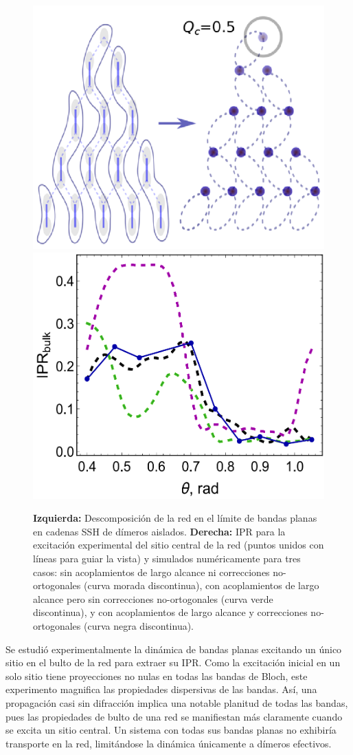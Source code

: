 \begin{figure}[H]
	\centering
	\includegraphics[width=0.5\linewidth]{media/cuasi-ssh.png}
	\includegraphics[width=0.45\linewidth]{media/ipr-bulk-exp.png}
	\caption[Descomposición de la red en cadenas cuasi-SSH]{  
		\textbf{Izquierda: }  
		Descomposición de la red en el límite de bandas planas en cadenas SSH de dímeros aislados. \textbf{Derecha: }  IPR para la excitación experimental del sitio central de la red (puntos unidos con líneas para guiar la vista) y simulados numéricamente para tres casos: sin acoplamientos de largo alcance ni correcciones no-ortogonales (curva morada discontinua), con acoplamientos de largo alcance pero sin correcciones no-ortogonales (curva verde discontinua), y con acoplamientos de largo alcance y correcciones no-ortogonales (curva negra discontinua).  \label{fig:cuasi-ssh}}
\end{figure} \vspace{-2ex}
Se estudió experimentalmente la dinámica de bandas planas excitando un único sitio en el bulto de la red para extraer su IPR. Como la excitación inicial en un solo sitio tiene proyecciones no nulas en todas las bandas de Bloch, este experimento magnifica las propiedades dispersivas de las bandas. Así, una propagación casi sin difracción implica una notable planitud de todas las bandas, pues las propiedades de bulto de una red se manifiestan más claramente cuando se excita un sitio central. Un sistema con todas sus bandas planas no exhibiría transporte en la red, limitándose la dinámica únicamente a dímeros efectivos.


